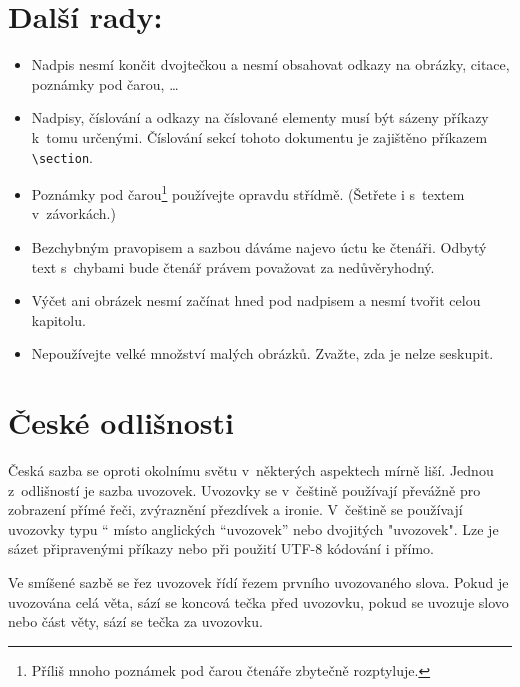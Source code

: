 \documentclass[a4paper, 10pt, twocolumn, final]{article}
\providecommand{\uv}[1]{\quotedblbase #1 \textquotedblleft}
\begin{document}
\section{Další rady:}

\begin{itemize}
    \item Nadpis nesmí končit dvojtečkou a nesmí obsahovat odkazy na obrázky, citace, poznámky pod čarou, \dots

    \item Nadpisy, číslování a odkazy na číslované elementy musí být sázeny příkazy k~tomu určenými.
    Číslování sekcí tohoto dokumentu je zajištěno příkazem \verb|\section|.

    \item Poznámky pod čarou\footnote{Příliš mnoho poznámek pod čarou čtenáře zbytečně rozptyluje.} používejte opravdu střídmě.
    (Šetřete i s~textem v~závorkách.)

    \item Bezchybným pravopisem a sazbou dáváme najevo úctu ke čtenáři.
    Odbytý text s~chybami bude čtenář právem považovat za nedůvěryhodný.

    \item Výčet ani obrázek nesmí začínat hned pod nadpisem a nesmí tvořit celou kapitolu.

    \item Nepoužívejte velké množství malých obrázků.
    Zvažte, zda je nelze seskupit.
\end{itemize}


\section{České odlišnosti}

Česká sazba se oproti okolnímu světu v~některých aspektech mírně liší.
Jednou z~odlišností je sazba uvozovek.
Uvozovky se v~češtině používají převážně pro zobrazení přímé řeči, zvýraznění přezdívek a ironie.
V~češtině se používají uvozovky typu \uv{9966} místo anglických ``uvozovek'' nebo dvojitých "uvozovek".
Lze je sázet připravenými příkazy nebo při použití UTF-8 kódování i přímo.

Ve smíšené sazbě se řez uvozovek řídí řezem prvního uvozovaného slova.
Pokud je uvozována celá věta, sází se koncová tečka před uvozovku, pokud se uvozuje slovo nebo část věty, sází se tečka za uvozovku.
\end{document}
